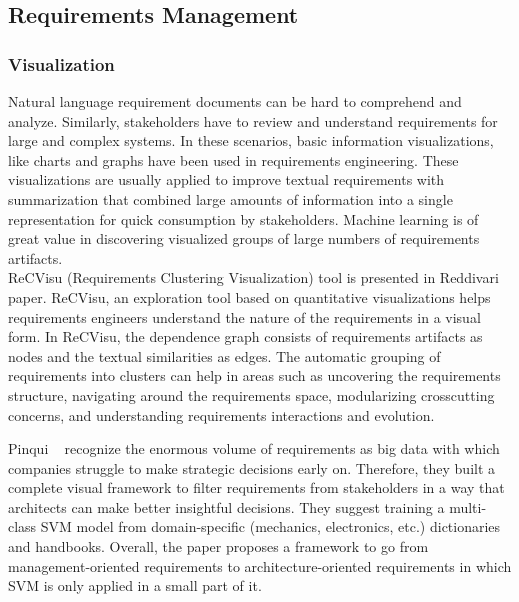 \subsection{Requirements Management}

\subsubsection{Visualization}

Natural language requirement documents can be hard to comprehend and analyze.
Similarly, stakeholders have to review and understand requirements for large and
complex systems.  In these scenarios, basic information visualizations, like
charts and graphs have been used in requirements engineering.
These visualizations are usually applied to improve textual requirements with
summarization that combined large amounts of information into a single
representation for quick consumption by stakeholders\cite{Reddivari:2012}.
Machine learning is of great value in discovering visualized groups of large
numbers of requirements artifacts.\\

ReCVisu (Requirements Clustering Visualization) tool is presented in Reddivari
\etal~\cite{Reddivari:2012} paper. ReCVisu, an exploration tool based on
quantitative visualizations helps requirements engineers understand the nature
of the requirements in a visual form. In ReCVisu, the dependence graph consists
of requirements artifacts as nodes and the textual similarities as edges. The
automatic grouping of requirements into clusters can help in areas such as
uncovering the requirements structure, navigating around the requirements space,
modularizing crosscutting concerns, and understanding requirements interactions
and evolution.\newline

Pinqui \etal~\cite{Pinqui:2015} recognize the enormous volume of requirements as
big data with which companies struggle to make strategic decisions early on.
Therefore, they built a complete visual framework to filter requirements from
stakeholders in a way that architects can make better insightful decisions. They
suggest training a multi-class SVM model from domain-specific (mechanics,
electronics, etc.) dictionaries and handbooks. Overall, the paper proposes a
framework to go from management-oriented requirements to architecture-oriented
requirements in which SVM is only applied in a small part of it. \newline

